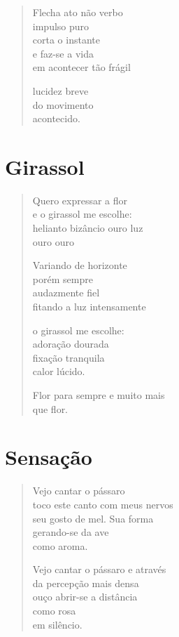 \begin{verse}
Flecha ato não verbo\\
impulso puro\\
corta o instante\\
e faz-se a vida\\
em acontecer tão frágil

lucidez breve\\
do movimento\\
acontecido.
\end{verse}

\chapter{Girassol}

\begin{verse}
Quero expressar a flor\\
e o girassol me escolhe:\\
helianto bizâncio ouro luz\\
\qquad\qquad\qquad\qquad\qquad\quad ouro ouro

Variando de horizonte\\
porém sempre\\
audazmente fiel\\
fitando a luz intensamente

o girassol me escolhe:\\
adoração dourada\\
fixação tranquila\\
calor lúcido.

Flor para sempre e muito mais\\
que flor.
\end{verse}

\chapter{Sensação}

\begin{verse}
Vejo cantar o pássaro\\
toco este canto com meus nervos\\
seu gosto de mel. Sua forma\\
gerando-se da ave\\
como aroma.

Vejo cantar o pássaro e através\\
da percepção mais densa\\
ouço abrir-se a distância\\
como rosa\\
em silêncio.
\end{verse}

